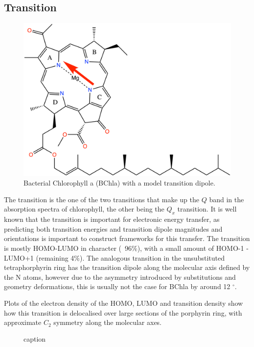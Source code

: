 \subsection{\Qy Transition}
\begin{figure}
    \centering
    \includegraphics{chapters/chapter03/chlorophyll_Qy.png}
    \caption{Bacterial Chlorophyll a (BChla) with a model \Qy transition dipole.}
    \label{fig:bchla_qy}
\end{figure}

The \Qy transition is the one of the two transitions that make up
the $Q$ band in the absorption spectra of chlorophyll, the other being the $Q_x$
transition. It is well known that the \Qy transition is important for electronic 
energy transfer, as predicting both transition energies and transition dipole 
magnitudes and orientations is important to construct frameworks for this transfer.
The \Qy transition is mostly HOMO-LUMO in character (~96\%), with a small amount of HOMO-1
- LUMO+1 (remaining 4\%). The analogous transition in the unsubstituted tetraphorphyrin
ring has the transition dipole along the molecular axis defined by the N atoms,
however due to the asymmetry introduced by substitutions and geometry deformations,
this is usually not the case for BChla by around 12 $^{\circ}$.

Plots of the electron density of the HOMO, LUMO and transition density show how
this transition is delocalised over large sections of the porphyrin ring, with 
approximate $C_2$ symmetry along the molecular axes.

\begin{figure}
    \caption{caption}
    \label{fig:HOMO}
\end{figure}

